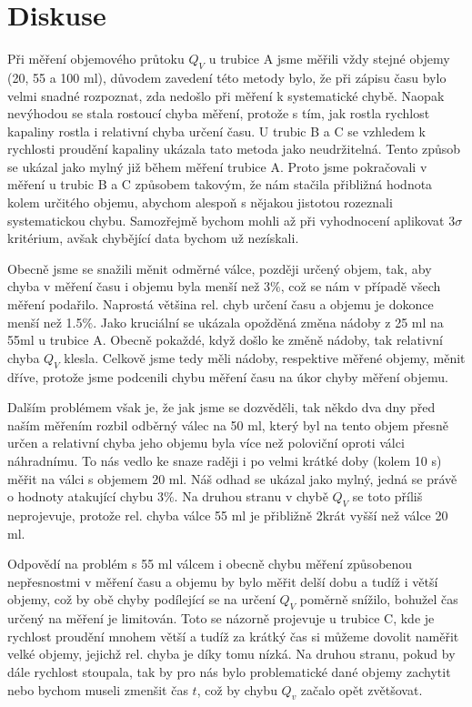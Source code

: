 \documentclass[a4paper]{article}
\begin{document}
\section*{Diskuse}
\par Při měření objemového průtoku $Q_{V}$ u trubice A jsme měřili vždy stejné objemy (20, 55 a 100 ml), důvodem zavedení této metody bylo, že při zápisu času bylo velmi snadné rozpoznat, zda nedošlo při měření k systematické chybě. Naopak nevýhodou se stala rostoucí chyba měření, protože s tím, jak rostla rychlost kapaliny rostla i relativní chyba určení času. U trubic B a C se vzhledem k rychlosti proudění kapaliny ukázala tato metoda jako neudržitelná. Tento způsob se ukázal jako mylný již během měření trubice A. Proto jsme pokračovali v měření u trubic B a C způsobem takovým, že nám stačila přibližná hodnota kolem určitého objemu, abychom alespoň s nějakou jistotou rozeznali systematickou chybu. Samozřejmě bychom mohli až při vyhodnocení aplikovat $3 \sigma$ kritérium, avšak chybějící data bychom už nezískali.
\par Obecně jsme se snažili měnit odměrné válce, později určený objem, tak, aby chyba v měření času i objemu byla menší než 3$\%$, což se nám v případě všech měření podařilo. Naprostá většina rel. chyb určení času a objemu je dokonce menší než 1.5$\%$. Jako kruciální se ukázala opožděná změna nádoby z 25 ml na 55ml u trubice A. Obecně pokaždé, když došlo ke změně nádoby, tak relativní chyba $Q_{V}$ klesla. Celkově jsme tedy měli nádoby, respektive měřené objemy, měnit dříve, protože jsme podcenili chybu měření času na úkor chyby měření objemu.
\par Dalším problémem však je, že jak jsme se dozvěděli, tak někdo dva dny před naším měřením rozbil odběrný válec na 50 ml, který byl na tento objem přesně určen a relativní chyba jeho objemu byla více než poloviční oproti válci náhradnímu. To nás vedlo ke snaze raději i po velmi krátké doby (kolem 10 s) měřit na válci s objemem 20 ml. Náš odhad se ukázal jako mylný, jedná se právě o hodnoty atakující chybu 3$\%$. Na druhou stranu v chybě $Q_{V}$ se toto příliš neprojevuje, protože rel. chyba válce 55 ml je přibližně 2krát vyšší než válce 20 ml.
\par Odpovědí na problém s 55 ml válcem i obecně chybu měření způsobenou nepřesnostmi v měření času a objemu by bylo měřit delší dobu a tudíž i větší objemy, což by obě chyby podílející se na určení $Q_{V}$ poměrně snížilo, bohužel čas určený na měření je limitován. Toto se názorně projevuje u trubice C, kde je rychlost proudění mnohem větší a tudíž za krátký čas si můžeme dovolit naměřit velké objemy, jejichž rel. chyba je díky tomu nízká. Na druhou stranu, pokud by dále rychlost stoupala, tak by pro nás bylo problematické dané objemy zachytit nebo bychom museli zmenšit čas $t$, což by chybu $Q_{v}$ začalo opět zvětšovat.
\end{document}
